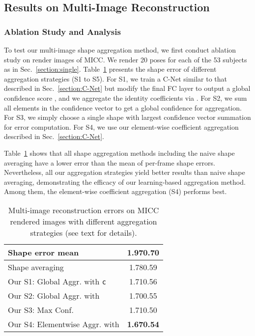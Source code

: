 \documentclass[10pt,twocolumn,letterpaper]{article}
\begin{document}
\subsection{Results on Multi-Image Reconstruction}

\subsubsection{Ablation Study and Analysis}\label{sec:multiimageabaltion}
To test our multi-image shape aggregation method, we first conduct ablation study on render images of MICC. We render 20 poses for each of the 53 subjects as in Sec.~\ref{section:single}. Table~\ref{table:florence} presents the shape error of different aggregation strategies (S1 to S5). For S1, we train a C-Net similar to that described in Sec.~\ref{section:C-Net} but modify the final FC layer to output a global confidence score , and we aggregate the identity coefficients via . For S2, we sum all elements in the confidence vector  to get a global confidence for aggregation. For S3, we simply choose a single shape with largest confidence vector summation for error computation. For S4, we use our element-wise coefficient aggregation described in Sec.~\ref{section:C-Net}.

Table~\ref{table:florence} shows that all shape aggregation methods including the naive shape averaging have a lower error than the mean of per-frame shape errors. Nevertheless, all our aggregation strategies yield better results than naive shape averaging, demonstrating the efficacy of our learning-based aggregation method. Among them, the element-wise coefficient aggregation (S4) performs best.

\begin{table}[t]
	\centering
	\caption{Multi-image reconstruction errors on MICC rendered images with different aggregation strategies (see text for details).}\label{table:florence}
	\small
	\begin{tabular}{lc}
		\hline
		Shape error mean & 1.970.70 \\
		\hline
		Shape averaging  & 1.780.59 \\
		\hline
		Our S1: Global Aggr. with \texttt{c}  & 1.710.56\\
		Our S2: Global Aggr. with  & 1.700.55\\
		Our S3: Max Conf.  & 1.710.50\\
		Our S4: Elementwise Aggr. with  & \textbf{1.670.54}\\
		\hline
	\end{tabular}
\end{table}
\end{document}
